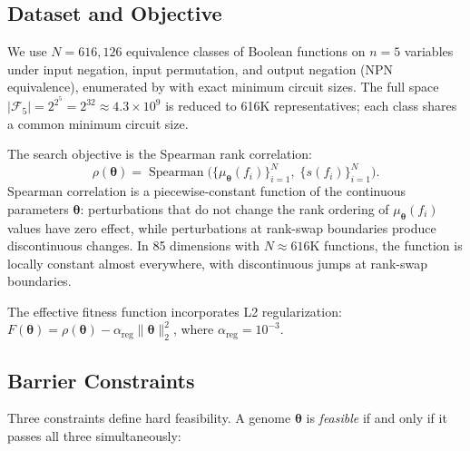 \documentclass[twoside]{article}
\newcommand{\btheta}{\boldsymbol{\theta}}
\newcommand{\calF}{\mathcal{F}}
\begin{document}
\subsection{Dataset and Objective}

We use $N = 616{,}126$ equivalence classes of Boolean functions on $n=5$
variables under input negation, input permutation, and output negation
(NPN equivalence),
enumerated by \citet{knuth2011art} with exact minimum circuit sizes.
The full space $|\calF_5| = 2^{2^5} = 2^{32} \approx 4.3 \times 10^9$ is
reduced to 616K representatives; each class shares a common minimum circuit size.

The search objective is the Spearman rank correlation:
\begin{equation}
\label{eq:objective}
\rho(\btheta) = \operatorname{Spearman}\bigl(\{\mu_\btheta(f_i)\}_{i=1}^N,\;
  \{s(f_i)\}_{i=1}^N\bigr).
\end{equation}
Spearman correlation is a piecewise-constant function of the continuous
parameters $\btheta$: perturbations that do not change the rank ordering of
$\mu_\btheta(f_i)$ values have zero effect, while perturbations at rank-swap
boundaries produce discontinuous changes. In 85 dimensions with $N \approx 616$K
functions, the function is locally constant almost everywhere, with
discontinuous jumps at rank-swap boundaries.

The effective fitness function incorporates L2 regularization:
$F(\btheta) = \rho(\btheta) - \alpha_{\text{reg}} \|\btheta\|_2^2$, where
$\alpha_{\text{reg}} = 10^{-3}$.

\subsection{Barrier Constraints}

Three constraints define hard feasibility. A genome $\btheta$ is \emph{feasible}
if and only if it passes all three simultaneously:
\end{document}
